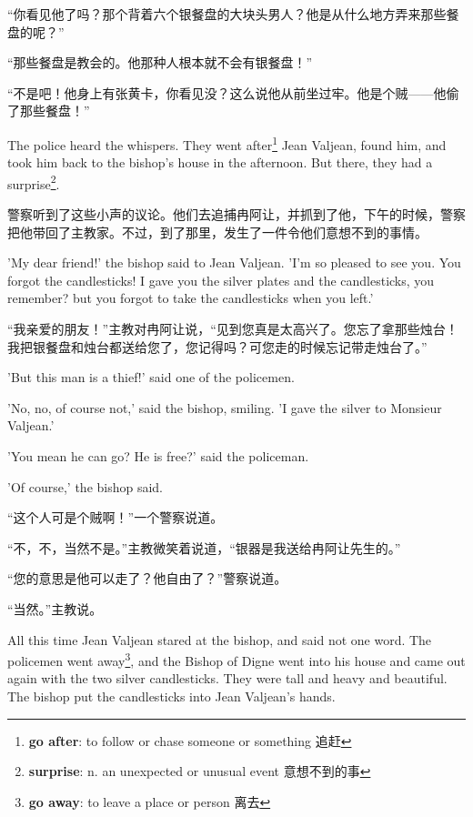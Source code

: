 \documentclass[fontset=ubuntu, zihao=5]{ctexart}
\begin{document}
\begin{paracol}{2}
  \switchcolumn

  “你看见他了吗？那个背着六个银餐盘的大块头男人？他是从什么地方弄来那些餐盘的呢？”

  “那些餐盘是教会的。他那种人根本就不会有银餐盘！”

  “不是吧！他身上有张黄卡，你看见没？这么说他从前坐过牢。他是个贼——他偷了那些餐盘！”

  \switchcolumn*

  The police heard the whispers. They went after\footnote{\textbf{go after}: to follow or chase someone or something 追赶} Jean Valjean, found him, and took him back to the bishop's house in the afternoon. But there, they had a surprise\footnote{\textbf{surprise}: n. an unexpected or unusual event 意想不到的事}.

  \switchcolumn
  警察听到了这些小声的议论。他们去追捕冉阿让，并抓到了他，下午的时候，警察把他带回了主教家。不过，到了那里，发生了一件令他们意想不到的事情。

  \switchcolumn*

  'My dear friend!' the bishop said to Jean Valjean. 'I'm so pleased to see you. You forgot the candlesticks! I gave you the silver plates and the candlesticks, you remember? but you forgot to take the candlesticks when you left.'

  \switchcolumn
  “我亲爱的朋友！”主教对冉阿让说，“见到您真是太高兴了。您忘了拿那些烛台！我把银餐盘和烛台都送给您了，您记得吗？可您走的时候忘记带走烛台了。”

  \switchcolumn*

  'But this man is a thief!' said one of the policemen.

  'No, no, of course not,' said the bishop, smiling. 'I gave the silver to Monsieur Valjean.'

  'You mean he can go? He is free?' said the policeman.

  'Of course,' the bishop said.

  \switchcolumn

  “这个人可是个贼啊！”一个警察说道。

  “不，不，当然不是。”主教微笑着说道，“银器是我送给冉阿让先生的。”

  “您的意思是他可以走了？他自由了？”警察说道。

  “当然。”主教说。

  \switchcolumn*

  All this time Jean Valjean stared at the bishop, and said not one word. The policemen went away\footnote{\textbf{go away}: to leave a place or person 离去}, and the Bishop of Digne went into his house and came out again with the two silver candlesticks. They were tall and heavy and beautiful. The bishop put the candlesticks into Jean Valjean's hands.


\end{paracol}
\end{document}

